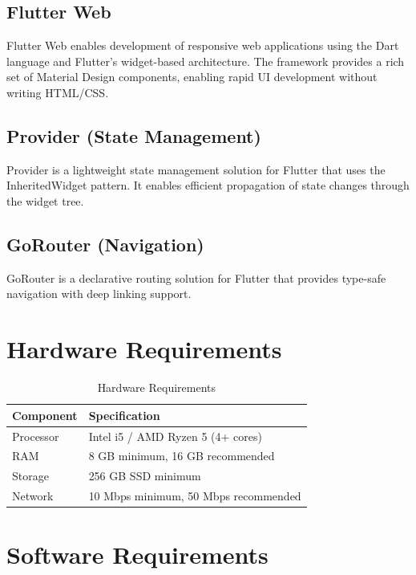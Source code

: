 \subsection{Flutter Web}

Flutter Web enables development of responsive web applications using the Dart language and Flutter's widget-based architecture. The framework provides a rich set of Material Design components, enabling rapid UI development without writing HTML/CSS.

\subsection{Provider (State Management)}

Provider is a lightweight state management solution for Flutter that uses the InheritedWidget pattern. It enables efficient propagation of state changes through the widget tree.

\subsection{GoRouter (Navigation)}

GoRouter is a declarative routing solution for Flutter that provides type-safe navigation with deep linking support.

\section{Hardware Requirements}

\begin{table}[H]
\centering
\caption{Hardware Requirements}
\label{tab:hardware}
\begin{tabular}{|l|l|}
\hline
\textbf{Component} & \textbf{Specification} \\
\hline
Processor & Intel i5 / AMD Ryzen 5 (4+ cores) \\
\hline
RAM & 8 GB minimum, 16 GB recommended \\
\hline
Storage & 256 GB SSD minimum \\
\hline
Network & 10 Mbps minimum, 50 Mbps recommended \\
\hline
\end{tabular}
\end{table}

\section{Software Requirements}

